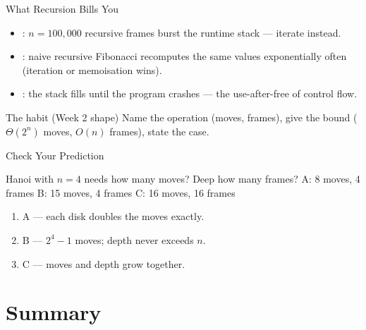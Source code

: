 \documentclass[aspectratio=169]{beamer}
\begin{document}
\begin{frame}{What Recursion Bills You}
  \begin{itemize}
    \item {}: $n = 100{,}000$ recursive frames burst the
      runtime stack --- iterate instead.
    \item {}: naive recursive Fibonacci recomputes
      the same values exponentially often (iteration or memoisation wins).
    \item {}: the stack fills until the program crashes
      --- the use-after-free of control flow.
  \end{itemize}
  \begin{exampleblock}{The habit (Week 2 shape)}
    Name the operation (moves, frames), give the bound ($\Theta(2^{n})$
    moves, $O(n)$ frames), state the case.
  \end{exampleblock}
\end{frame}

\begin{frame}{Check Your Prediction}
  \begin{block}{Hanoi with $n = 4$ needs how many moves? Deep how many frames?}
    A: 8 moves, 4 frames \quad B: 15 moves, 4 frames \quad C: 16 moves, 16 frames
  \end{block}
  \begin{enumerate}
    \item A --- each disk doubles the moves exactly.
    \item B --- $2^{4} - 1$ moves; depth never exceeds $n$.
    \item C --- moves and depth grow together.
  \end{enumerate}
\end{frame}


\section{Summary}
\end{document}
